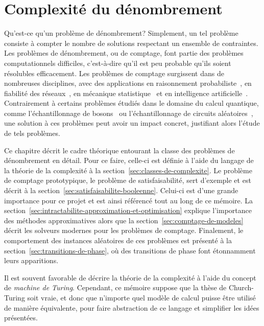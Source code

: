 \chapter{Complexité du dénombrement}
\label{cha:complexite-du-denombrement}

Qu'est-ce qu'un problème de dénombrement? Simplement, un tel problème consiste à compter le nombre de solutions respectant un ensemble de contraintes. Les problèmes de dénombrement, ou de comptage, font partie des problèmes computationnels difficiles, c'est-à-dire qu'il est peu probable qu'ils soient résolubles efficacement. Les problèmes de comptage surgissent dans de nombreuses disciplines, avec des applications en raisonnement probabiliste~\cite{rothHardnessApproximateReasoning1996, sangPerformingBayesianInference2005, abramsonHailfinderBayesianSystem1996}, en fiabilité des réseaux~\cite{valiantComplexityEnumerationReliability1979, duenas-osorioCountingbasedReliabilityEstimation2017}, en mécanique statistique~\cite{jerrumPolynomialTimeApproximationAlgorithms1993} et en intelligence artificielle~\cite{balutaQuantitativeVerificationNeural2019}. Contrairement à certains problèmes étudiés dans le domaine du calcul quantique, comme l'échantillonnage de bosons~\cite{aaronsonComputationalComplexityLinear2011} ou l'échantillonnage de circuits aléatoires~\cite{boulandComplexityVerificationQuantum2019}, une solution à ces problèmes peut avoir un impact concret, justifiant alors l'étude de tels problèmes.

Ce chapitre décrit le cadre théorique entourant la classe des problèmes de dénombrement en détail. Pour ce faire, celle-ci est définie à l'aide du langage de la théorie de la complexité à la section~\ref{sec:classes-de-complexite}. Le problème de comptage prototypique, le problème de satisfaisabilité, sert d'exemple et est décrit à la section~\ref{sec:satisfaisabilite-booleenne}. Celui-ci est d'une grande importance pour ce projet et est ainsi référencé tout au long de ce mémoire. La section~\ref{sec:intractabilite-approximation-et-optimisation} explique l'importance des méthodes approximatives alors que la section~\ref{sec:comptage-de-modeles} décrit les solveurs modernes pour les problèmes de comptage. Finalement, le comportement des instances aléatoires de ces problèmes est présenté à la section~\ref{sec:transitions-de-phase}, où des transitions de phase font étonnamment leurs apparitions.

Il est souvent favorable de décrire la théorie de la complexité à l'aide du concept de \textit{machine de Turing}. Cependant, ce mémoire suppose que la thèse de Church-Turing soit vraie, et donc que n'importe quel modèle de calcul puisse être utilisé de manière équivalente, pour faire abstraction de ce langage et simplifier les idées présentées.

